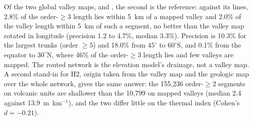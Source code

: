 Of the two global valley maps, \citet{Hynek2010} and \citet{Alemanno2018}, the second is the reference: against its
lines, 2.8\% of the order-$\ge3$ length lies within 5~km of a mapped
valley and 2.0\% of the valley length within 5~km of such a segment, no better than the valley map rotated in longitude
(precision 1.2 to 4.7\%, median 3.3\%). Precision is 10.3\% for the largest trunks (order $\ge5$) and 18.0\% from
$45^{\circ}$ to $60^{\circ}$S, and 0.1\% from the equator to $30^{\circ}$N, where 46\% of the order-$\ge3$ length lies
and few valleys are mapped. The routed network is the elevation model's drainage, not a valley map.
A second stand-in for H2, origin taken from the valley map and the geologic map over the whole network, gives the same
answer: the 155,236 order-$\ge2$ segments on volcanic units are shallower than the 10,799 on mapped valleys (median 2.4
against 13.9~m~km$^{-1}$), and the two differ little on the thermal index (Cohen's $d=-0.21$).

